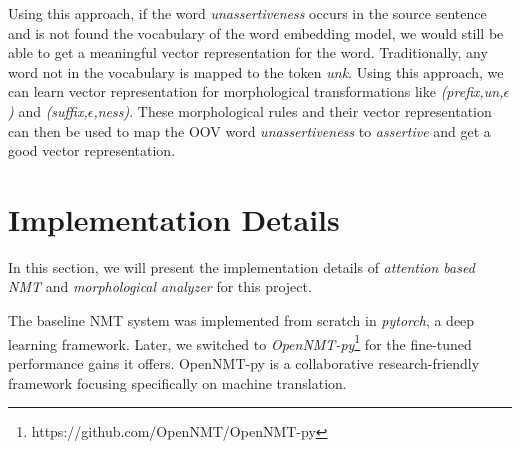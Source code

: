 %
%
%
%
%


Using this approach, if the word \textit{unassertiveness} occurs in the source sentence and is not found the vocabulary of the word embedding model, we would still be able to get a meaningful vector representation for the word. Traditionally, any word not in the vocabulary is mapped to the token \textit{unk}. Using this approach, we can learn vector representation for morphological transformations like \textit{(prefix,un,$\epsilon$)} and \textit{(suffix,$\epsilon$,ness)}. These morphological rules and their vector representation can then be used to map the OOV word \textit{unassertiveness} to  \textit{assertive} and get a good vector representation. 



\section{Implementation Details}
\label{sec:implementation}
In this section, we will present the implementation details of \textit{attention based NMT} and \textit{morphological analyzer} for this project.

The baseline NMT system was implemented from scratch in \textit{pytorch}, a deep learning framework. Later, we switched to \textit{OpenNMT-py}\footnote{https://github.com/OpenNMT/OpenNMT-py} for the fine-tuned performance gains it offers. OpenNMT-py is a collaborative research-friendly framework focusing specifically on machine translation. 

